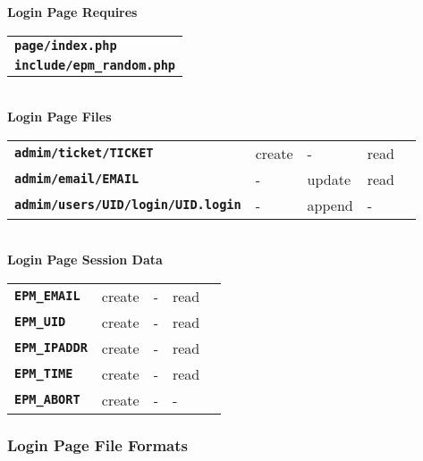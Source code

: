 \documentclass[12pt]{article}
\newcommand{\TT}[1]{{\tt \bfseries #1}}
\begin{document}
\begin{center}
{\bf Login Page Requires}
\\[1ex]
\begin{tabular}{l}
\TT{page/index.php} \\
\TT{include/epm\_random.php} \\
\end{tabular}
\\[3ex]
{\bf Login Page Files}
\\[1ex]
\begin{tabular}{lllll}
\TT{admim/ticket/TICKET}	& create  & -      & read \\
\TT{admim/email/EMAIL}	& -       & update & read \\
\TT{admim/users/UID/login/UID.login}
			& -       & append & - \\
\end{tabular}
\\[3ex]
{\bf Login Page Session Data}
\\[1ex]
\begin{tabular}{lllll}
\TT{EPM\_EMAIL}	& create  & -      & read \\
\TT{EPM\_UID}	& create  & -      & read    \\
\TT{EPM\_IPADDR}& create  & -      & read \\
\TT{EPM\_TIME}
                & create  & -      & read \\
\TT{EPM\_ABORT}
                & create  & -      & - \\
\end{tabular}
\end{center}

\subsubsection{Login Page File Formats}
\end{document}
